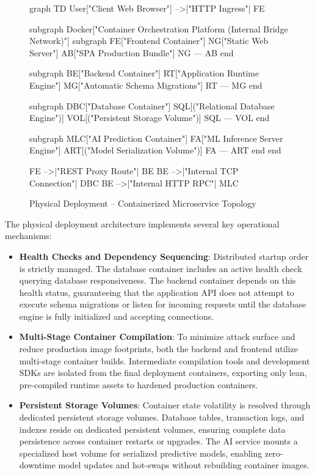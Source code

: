 \begin{figure}[H]
  \centering
  \begin{mermaid}[width=0.92\textwidth]
graph TD
    User["Client Web Browser"] -->|"HTTP Ingress"| FE

    subgraph Docker["Container Orchestration Platform (Internal Bridge Network)"]
        subgraph FE["Frontend Container"]
            NG["Static Web Server"]
            AB["SPA Production Bundle"]
            NG --- AB
        end

        subgraph BE["Backend Container"]
            RT["Application Runtime Engine"]
            MG["Automatic Schema Migrations"]
            RT --- MG
        end

        subgraph DBC["Database Container"]
            SQL[("Relational Database Engine")]
            VOL[("Persistent Storage Volume")]
            SQL --- VOL
        end

        subgraph MLC["AI Prediction Container"]
            FA["ML Inference Server Engine"]
            ART[("Model Serialization Volume")]
            FA --- ART
        end
    end

    FE -->|"REST Proxy Route"| BE
    BE -->|"Internal TCP Connection"| DBC
    BE -->|"Internal HTTP RPC"| MLC
  \end{mermaid}
  \caption{Physical Deployment -- Containerized Microservice Topology}
  \label{fig:physical_deployment}
\end{figure}

The physical deployment architecture implements several key operational mechanisms:
\begin{itemize}
  \item \textbf{Health Checks and Dependency Sequencing}: Distributed startup order is strictly managed. The database container includes an active health check querying database responsiveness. The backend container depends on this health status, guaranteeing that the application API does not attempt to execute schema migrations or listen for incoming requests until the database engine is fully initialized and accepting connections.
  \item \textbf{Multi-Stage Container Compilation}: To minimize attack surface and reduce production image footprints, both the backend and frontend utilize multi-stage container builds. Intermediate compilation tools and development SDKs are isolated from the final deployment containers, exporting only lean, pre-compiled runtime assets to hardened production containers.
  \item \textbf{Persistent Storage Volumes}: Container state volatility is resolved through dedicated persistent storage volumes. Database tables, transaction logs, and indexes reside on dedicated persistent volumes, ensuring complete data persistence across container restarts or upgrades. The AI service mounts a specialized host volume for serialized predictive models, enabling zero-downtime model updates and hot-swaps without rebuilding container images.
\end{itemize}

